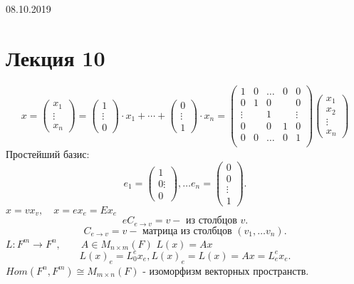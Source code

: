 \documentclass[12pt]{report}
\begin{document}
08.10.2019
\section{Лекция 10}
$$
x = 
 \left ( 
\begin{array}{c}
x_1 \\ \vdots \\x_n 
\end{array}
\right )
= \left ( 
\begin{array}{c}
1 \\ \vdots \\ 0
\end{array}
\right )\cdot x_1 + \cdots + \left ( 
\begin{array}{c}
0 \\ \vdots \\ 1
\end{array}
\right ) \cdot x_n = 
\left ( 
\begin{array}{ccccc}
    1 & 0  & \ldots & 0 & 0 \\
    0 & 1  & 0 & & 0\\
    \vdots & & 1 & & \vdots \\
    0 &  & 0 & 1 & 0\\
    0 & 0  & \ldots & 0 & 1 \\
\end{array}
\right )
\left ( 
\begin{array}{c}
    x_1 \\ x_2 \\ \vdots \\ x_n
\end{array}
\right )
$$
Простейший базис:
\[
e_1 = 
\left ( 
\begin{array}{c}
1 \\ 0 \vdots \\ 0
\end{array}
\right )
, \ldots e_n = \left ( 
\begin{array}{c}
0 \\ 0 \\ \vdots \\ 1
\end{array}
\right )
.\] 
$x = v x_v, \quad x = e x_e = E x_e$\\
 \[
     e C_{e \to v} = v - \mbox{ из столбцов } v
.\] 
\[
    C_{e \to v} = v - \mbox{ матрица из столбцов } (v_1, \ldots v_n)
.\] 
$L: F^m \to F^n , \qquad A \in M_{n \times m}(F)$
$L(x) = A x$\\
 \[
     L(x)_e = L_0^e x_e , L(x)_e = L(x) = Ax = L_e ^e x_e
.\] 
$Hom (F^n , F^m ) \cong M_{m\times n} (F)$ - изоморфизм векторных пространств.
\end{document}
